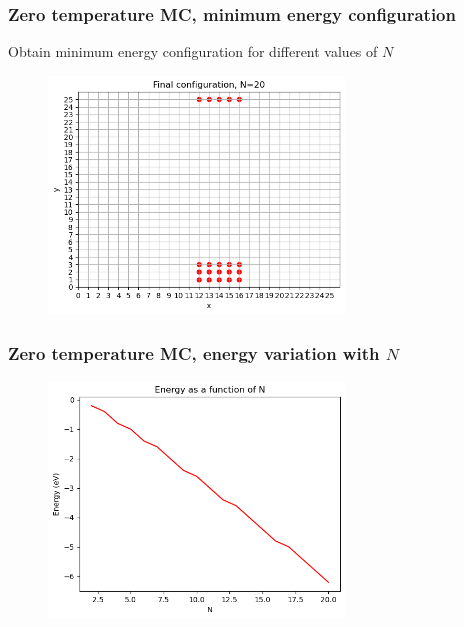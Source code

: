 \documentclass{beamer}
\begin{document}
\begin{frame}
    \frametitle{Zero temperature MC, minimum energy configuration}

    \centering Obtain minimum energy configuration for different values of $N$

    \begin{figure}
        \includegraphics[width=0.7\textwidth]{images/finconf20b.png}
    \end{figure}

\end{frame}

\begin{frame}
    \frametitle{Zero temperature MC, energy variation with $N$}

    \begin{figure}
        \includegraphics[width=0.7\textwidth]{images/energyb.png}
    \end{figure}

\end{frame}
\end{document}
